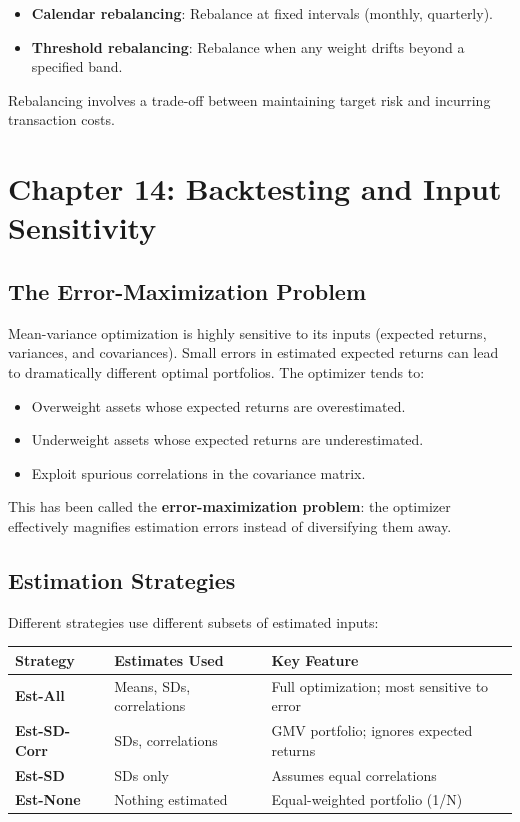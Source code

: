 \documentclass[11pt,letterpaper]{report}
\begin{document}
\begin{itemize}
  \item \textbf{Calendar rebalancing}: Rebalance at fixed intervals (monthly, quarterly).
  \item \textbf{Threshold rebalancing}: Rebalance when any weight drifts beyond a specified band.
\end{itemize}

Rebalancing involves a trade-off between maintaining target risk and incurring transaction costs.


\chapter{Chapter 14: Backtesting and Input Sensitivity}


\section{The Error-Maximization Problem}


Mean-variance optimization is highly sensitive to its inputs (expected returns, variances, and covariances).  Small errors in estimated expected returns can lead to dramatically different optimal portfolios.  The optimizer tends to:

\begin{itemize}
  \item Overweight assets whose expected returns are overestimated.
  \item Underweight assets whose expected returns are underestimated.
  \item Exploit spurious correlations in the covariance matrix.
\end{itemize}

This has been called the \textbf{error-maximization problem}: the optimizer effectively magnifies estimation errors instead of diversifying them away.

\section{Estimation Strategies}


Different strategies use different subsets of estimated inputs:

\begin{center}
\begin{tabular}{lll}
\toprule
\textbf{Strategy} & \textbf{Estimates Used} & \textbf{Key Feature} \\
\midrule
\textbf{Est-All} & Means, SDs, correlations & Full optimization; most sensitive to error \\
\textbf{Est-SD-Corr} & SDs, correlations & GMV portfolio; ignores expected returns \\
\textbf{Est-SD} & SDs only & Assumes equal correlations \\
\textbf{Est-None} & Nothing estimated & Equal-weighted portfolio (1/N) \\
\bottomrule
\end{tabular}
\end{center}
\end{document}
